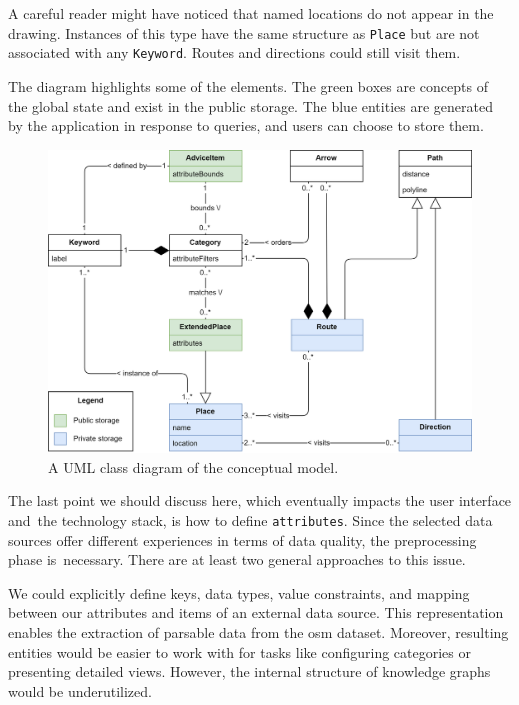 A careful reader might have noticed that named locations do not appear in the drawing. Instances of this type have the same structure as \texttt{Place} but are not associated with any \texttt{Keyword}. Routes and directions could still visit them.

The diagram highlights some of the elements. The green boxes are concepts of the global state and exist in the public storage. The blue entities are generated by the application in response to queries, and users can choose to store them.

\begin{figure}[!h]
\centering
\includegraphics[width=0.98\linewidth]{img/analysis/conceptual-model.png}
\caption{A UML class diagram of the conceptual model.}
\label{fig:conceptual-model}
\end{figure}

The last point we should discuss here, which eventually impacts the user interface and~the technology stack, is how to define \texttt{attributes}. Since the selected data sources offer different experiences in terms of data quality, the preprocessing phase is~nec\-es\-sary. There are at least two general approaches to this issue.

We could explicitly define keys, data types, value constraints, and mapping between our attributes and items of an external data source. This representation enables the extraction of parsable data from the \acs{osm} dataset. Moreover, resulting entities would be easier to work with for tasks like configuring categories or presenting detailed views. However, the internal structure of knowledge graphs would be underutilized.

